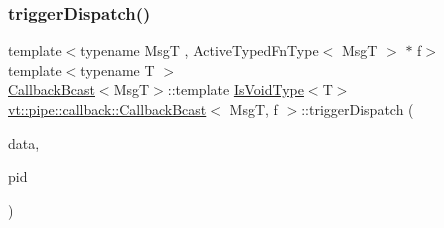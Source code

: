 \mbox{\label{structvt_1_1pipe_1_1callback_1_1_callback_bcast_a3f7a3a2894572c6c59be68ca4687bcad}} 
\subsubsection{\texorpdfstring{trigger\+Dispatch()}{triggerDispatch()}\hspace{0.1cm}{\footnotesize\ttfamily [2/4]}}
{\footnotesize\ttfamily template$<$typename MsgT , Active\+Typed\+Fn\+Type$<$ Msg\+T $>$ $\ast$ f$>$ \\
template$<$typename T $>$ \\
\hyperlink{structvt_1_1pipe_1_1callback_1_1_callback_bcast}{Callback\+Bcast}$<$MsgT$>$\+::template \hyperlink{structvt_1_1pipe_1_1callback_1_1_callback_bcast_a3ca08c23824cfac76b837311a1d2c929}{Is\+Void\+Type}$<$T$>$ \hyperlink{structvt_1_1pipe_1_1callback_1_1_callback_bcast}{vt\+::pipe\+::callback\+::\+Callback\+Bcast}$<$ MsgT, f $>$\+::trigger\+Dispatch (\begin{DoxyParamCaption}\item[{\mbox{[}\mbox{[}maybe\+\_\+unused\mbox{]} \mbox{]} \hyperlink{structvt_1_1pipe_1_1callback_1_1_callback_bcast_aaf994b71056001334d30d74fa9c958f9}{Signal\+Data\+Type} $\ast$}]{data,  }\item[{\hyperlink{namespacevt_ac9852acda74d1896f48f406cd72c7bd3}{Pipe\+Type} const \&}]{pid }\end{DoxyParamCaption})}

\mbox{\label{structvt_1_1pipe_1_1callback_1_1_callback_bcast_a6a0c65ef395baea684879a696e9fa8f1}} 
